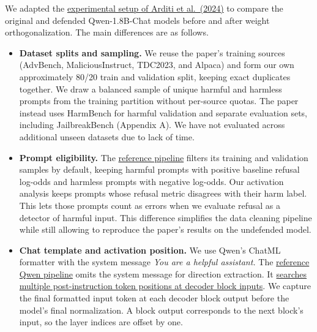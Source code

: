 \documentclass[10pt,letterpaper]{article}
\begin{document}
We adapted the \href{https://arxiv.org/html/2406.11717v3}{experimental setup of Arditi et al.\ (2024)} to compare the original and defended Qwen-1.8B-Chat models before and after weight orthogonalization. The main differences are as follows.
\begin{itemize}
    \item \textbf{Dataset splits and sampling.} We reuse the paper's training sources (AdvBench, MaliciousInstruct, TDC2023, and Alpaca) and form our own approximately 80/20 train and validation split, keeping exact duplicates together. We draw a balanced sample of unique harmful and harmless prompts from the training partition without per-source quotas. The paper instead uses HarmBench for harmful validation and separate evaluation sets, including JailbreakBench (Appendix A). We have not evaluated across additional unseen datasets due to lack of time.

    \item \textbf{Prompt eligibility.} The \href{https://github.com/andyrdt/refusal_direction/blob/main/pipeline/run_pipeline.py}{reference pipeline} filters its training and validation samples by default, keeping harmful prompts with positive baseline refusal log-odds and harmless prompts with negative log-odds. Our activation analysis keeps prompts whose refusal metric disagrees with their harm label. This lets those prompts count as errors when we evaluate refusal as a detector of harmful input. This difference simplifies the data cleaning pipeline while still allowing to reproduce the paper's results on the undefended model.

    \item \textbf{Chat template and activation position.} We use Qwen's ChatML formatter with the system message \textit{You are a helpful assistant.} The \href{https://github.com/andyrdt/refusal_direction/blob/main/pipeline/model_utils/qwen_model.py}{reference Qwen pipeline} omits the system message for direction extraction. It \href{https://github.com/andyrdt/refusal_direction/blob/main/pipeline/submodules/generate_directions.py}{searches multiple post-instruction token positions at decoder block inputs}. We capture the final formatted input token at each decoder block output before the model's final normalization. A block output corresponds to the next block's input, so the layer indices are offset by one.


\end{itemize}
\end{document}
